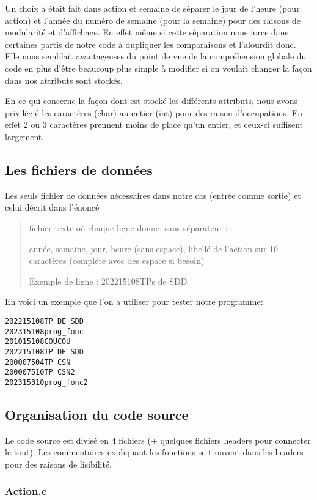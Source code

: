 \documentclass[11pt]{article}
\begin{document}
Un choix à était fait dans action et semaine de séparer le jour de l'heure
(pour action) et l'année du numéro de semaine (pour la semaine) pour des
raisons de modularité et d'affichage. En effet même si cette séparation nous force
dans certaines partis de notre code à dupliquer les comparaisons et
l'alourdit donc. Elle nous semblait avantageuses du point de vue de la
compréhension globale du code en plus d'être beaucoup plus simple à modifier
si on voulait changer la façon dans nos attributs sont stockés.

En ce qui concerne la façon dont est stocké les différents attributs, nous
avons privilégié les caractères (char) au entier (int) pour des raison
d'occupations. En effet 2 ou 3 caractères prennent moins de place qu'un
entier, et ceux-ci suffisent largement.


\subsection{Les fichiers de données}
\label{sec:org2e0b25f}

Les seuls fichier de données nécessaires dans notre cas (entrée comme sortie)
et celui décrit dans l'énoncé

\begin{quote}
fichier texte où chaque ligne donne, sans séparateur :

année, semaine, jour, heure (sans espace), libellé de l’action sur 10 caractères
(complété avec des espace si besoin)

Exemple de ligne : 202215108TPs de SDD
\end{quote}

En voici un exemple que l'on a utiliser pour tester notre programme:

\begin{verbatim}
202215108TP DE SDD
202315108prog_fonc
201015108COUCOU
202215108TP DE SDD
200007504TP CSN
200007510TP CSN2
202315310prog_fonc2
\end{verbatim}


\subsection{Organisation du code source}
\label{sec:orgc7ce4a3}

Le code source est divisé en 4 fichiers (+ quelques fichiers headers pour
connecter le tout). Les commentaires expliquant les fonctions se trouvent dans
les headers pour des raisons de lisibilité. 

\subsubsection{Action.c}
\label{sec:org830128b}
\end{document}
